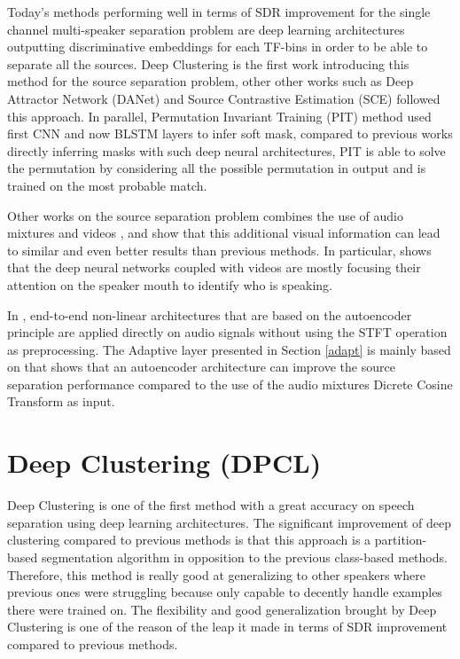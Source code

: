 \documentclass[master,final,11pt]{iscs-thesis}
\begin{document}
Today's methods performing well in terms of SDR improvement for the single channel multi-speaker separation problem are deep learning architectures outputting discriminative embeddings for each TF-bins in order to be able to separate all the sources. Deep Clustering \cite{DPCLV1} is the first work introducing this method for the source separation problem, other other works such as Deep Attractor Network (DANet) \cite{DANet} and Source Contrastive Estimation (SCE) \cite{SCE} followed this approach. In parallel, Permutation Invariant Training (PIT) \cite{PIT, PIT1, PIT_recog} method used first CNN and now BLSTM layers to infer soft mask, compared to previous works directly inferring masks with such deep neural architectures, PIT is able to solve the permutation by considering all the possible permutation in output and is trained on the most probable match. 

Other works on the source separation problem  combines the use of audio mixtures and videos \cite{DAVSE, ImageSS, SpeechEnh}, and show that this additional visual information can lead to similar and even better results than previous methods. In particular, \cite{ImageSS} shows that the deep neural networks coupled with videos are mostly focusing their attention on the speaker mouth to identify who is speaking.


In \cite{TAS, Adaptive}, end-to-end non-linear architectures that are based on the autoencoder principle are applied directly on audio signals without using the STFT operation as preprocessing. 
The Adaptive layer presented in Section \ref{adapt} is mainly based on \cite{Adaptive} that shows that an autoencoder architecture can improve the source separation performance compared to the use of the audio mixtures Dicrete Cosine Transform as input.

\section{Deep Clustering (DPCL)}

Deep Clustering \cite{DPCLV1,DPCLV2, DPCLEXT, chimera} is one of the first method with a great accuracy on speech separation using deep learning architectures. The significant improvement of deep clustering compared to previous methods is that this approach is a partition-based segmentation algorithm in opposition to the previous class-based methods. Therefore, this method is really good at generalizing to other speakers where previous ones were struggling because only capable to decently handle examples there were trained on. The flexibility and good generalization brought by Deep Clustering is one of the reason of the leap it made in terms of SDR improvement compared to previous methods.
\end{document}
